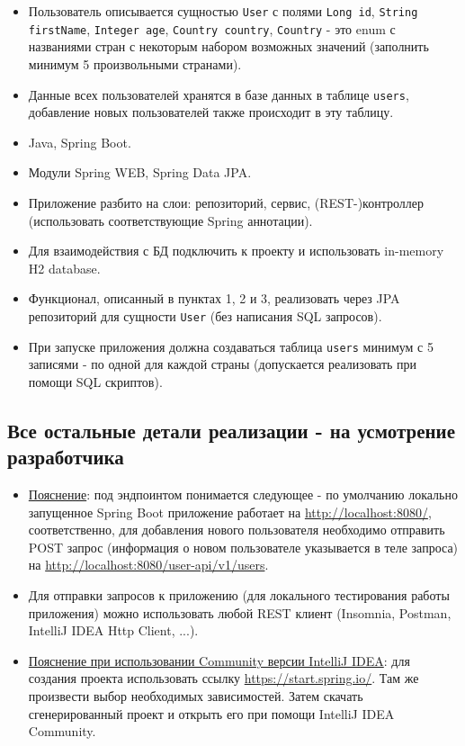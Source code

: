 \documentclass[a4paper, 14pt]{article}
\begin{document}
\begin{itemize}
	\item Пользователь описывается сущностью \texttt{User} с полями \texttt{Long id}, \texttt{String firstName}, \texttt{Integer age}, \texttt{Country country}, \texttt{Country} - это enum с названиями стран с некоторым набором возможных значений (заполнить минимум 5 произвольными странами).
	\item Данные всех пользователей хранятся в базе данных в таблице \texttt{users}, добавление новых пользователей также происходит в эту таблицу.
	\item Java, Spring Boot.
	\item Модули Spring WEB, Spring Data JPA.
	\item Приложение разбито на слои: репозиторий, сервис, (REST-)контроллер (использовать соответствующие Spring аннотации).
	\item Для взаимодействия с БД подключить к проекту и использовать in-memory H2 database.
	\item Функционал, описанный в пунктах 1, 2 и 3, реализовать через JPA репозиторий для сущности \texttt{User} (без написания SQL запросов).
	\item При запуске приложения должна создаваться таблица \texttt{users} минимум с 5 записями - по одной для каждой страны (допускается реализовать при помощи SQL скриптов).
\end{itemize}

\subsection{Все остальные детали реализации - на усмотрение разработчика}

\begin{itemize}
	\item \underline{Пояснение}: под эндпоинтом понимается следующее - по умолчанию локально запущенное Spring Boot приложение работает на \url{http://localhost:8080/}, соответственно, для добавления нового пользователя необходимо отправить POST запрос (информация о новом пользователе указывается в теле запроса) на \url{http://localhost:8080/user-api/v1/users}.
	\item Для отправки запросов к приложению (для локального тестирования работы приложения) можно использовать любой REST клиент (Insomnia, Postman, IntelliJ IDEA Http Client, ...).
	\item \underline{Пояснение при использовании Community версии IntelliJ IDEA}: для создания проекта использовать ссылку \url{https://start.spring.io/}. Там же произвести выбор необходимых зависимостей. Затем скачать сгенерированный проект и открыть его при помощи IntelliJ IDEA Community.
\end{itemize}
\end{document}
